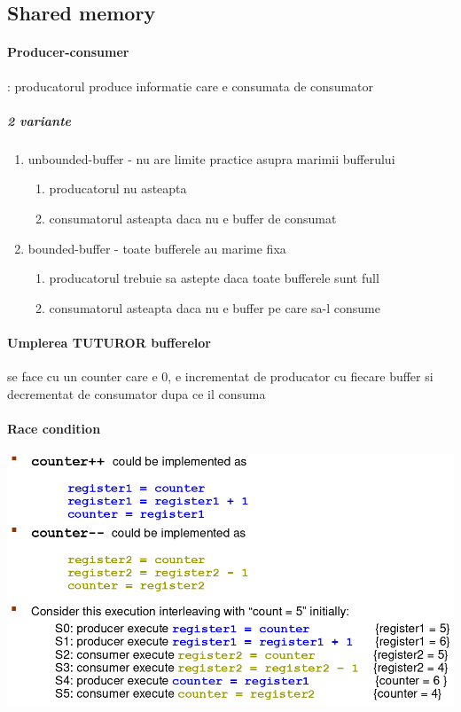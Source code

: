 \documentclass{article}
\begin{document}
\subsection*{Shared memory}

\paragraph*{Producer-consumer}: producatorul produce informatie care e consumata de consumator
\subparagraph*{2 variante}
\begin{enumerate}
    \item unbounded-buffer - nu are limite practice asupra marimii bufferului
    \begin{enumerate}
        \item producatorul nu asteapta
        \item consumatorul asteapta daca nu e buffer de consumat
    \end{enumerate}
    \item bounded-buffer - toate bufferele au marime fixa
    \begin{enumerate}
        \item producatorul trebuie sa astepte daca toate bufferele sunt full
        \item consumatorul asteapta daca nu e buffer pe care sa-l consume
    \end{enumerate}
\end{enumerate}

\paragraph*{Umplerea TUTUROR bufferelor} se face cu un counter care e 0, e incrementat de producator cu fiecare buffer si decrementat de consumator dupa ce il consuma

\paragraph*{Race condition}

\begin{center}
    \includegraphics[scale=0.3]{6_racecondition.png}
\end{center}
\end{document}
